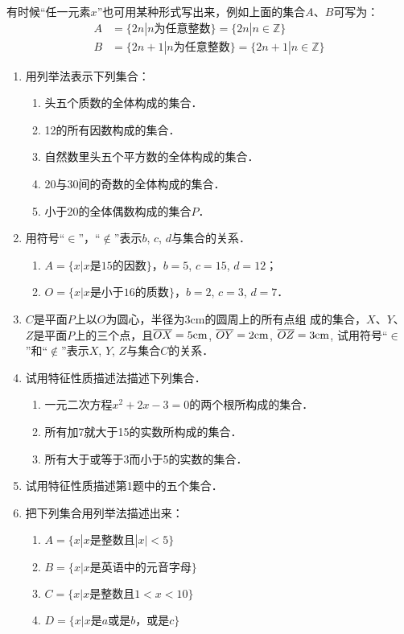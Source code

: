 有时候“任一元素$x$”也可用某种形式写出来，例如上面的集合$A$、$B$可写为：
\[\begin{split}
	A&=\{2n|n\text{为任意整数}\}=\{2n|n\in\mathbb{Z}\}\\
	B&=\{2n+1|n\text{为任意整数}\}=\{2n+1|n\in\mathbb{Z}\}
\end{split}\]

\begin{ex}
	\begin{enumerate}
		\item 用列举法表示下列集合：
		\begin{enumerate}
			\item 头五个质数的全体构成的集合．
			\item 12的所有因数构成的集合．
			\item 自然数里头五个平方数的全体构成的集合．
			\item 20与30间的奇数的全体构成的集合．
			\item 小于20的全体偶数构成的集合$P$．
		\end{enumerate}
		
		\item 用符号“$\in$”，“$\notin$”表示$b$, $c$, $d$与集合的关系．
		\begin{enumerate}
			\item $A=\{x|x\text{是15的因数}\}$，$b=5$, $c=15$, $d=12$；
			\item $O=\{x|x\text{是小于16的质数}\}$，$b=2$, $c=3$, $d=7$．
		\end{enumerate}
		
		\item $C$是平面$P$上以$O$为圆心，半径为3cm的圆周上的所有点组
		成的集合，$X$、$Y$、$Z$是平面$P$上的三个点，且$\overline{OX}=5{\rm cm}$, $\overline{OY}=2{\rm  cm}$, $\overline{OZ}=3{\rm cm}$, 试用符号“$\in$”和“$\notin$”表示$X$,
		$Y$, $Z$与集合$C$的关系．
		
		\item 试用特征性质描述法描述下列集合．
		\begin{enumerate}
			\item 一元二次方程$x^2+2x-3=0$的两个根所构成的集合．
			\item 所有加7就大于15的实数所构成的集合．
			\item 所有大于或等于3而小于5的实数的集合．
		\end{enumerate}
		
		\item 试用特征性质描述第1题中的五个集合．
		
		\item 把下列集合用列举法描述出来：
		\begin{enumerate}
			\item $A=\{x|x\text{是整数且}|x|<5\}$
			\item $B=\{x|x\text{是英语中的元音字母}\}$
			\item $C=\{x|x\text{是整数且}1<x<10  \}$
			\item $D=\{x|x\text{是$a$或是$b$，或是$c$}\}$
		\end{enumerate}
	\end{enumerate} 
\end{ex}

